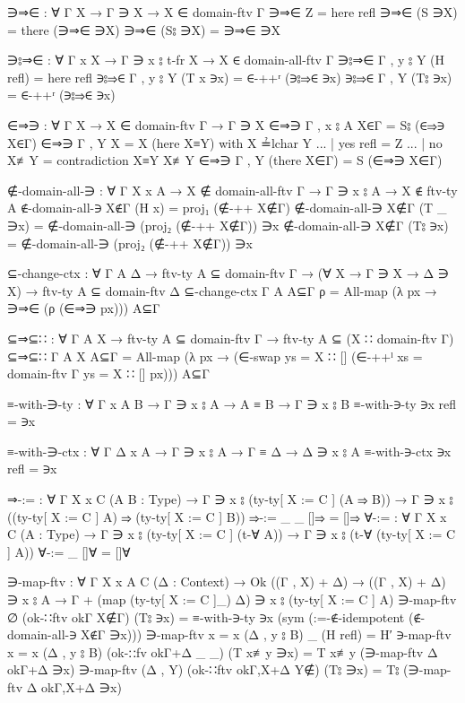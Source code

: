 \documentclass[logo,bsc,singlespacing,parskip,online]{infthesis}
\renewenvironment{code}{\mintedcopy[breaklines,breaksymbolleft=\;]{agda}}{\endmintedcopy}
\begin{document}
\begin{code}
  ∋⇒∈ : ∀ {Γ X} → Γ ∋ X → X ∈ domain-ftv Γ
  ∋⇒∈ Z = here refl
  ∋⇒∈ (S ∋X) = there (∋⇒∈ ∋X)
  ∋⇒∈ (S⦂ ∋X) = ∋⇒∈ ∋X

  ∋⦂⇒∈ : ∀ {Γ x X} → Γ ∋ x ⦂ t-fr X → X ∈ domain-all-ftv Γ
  ∋⦂⇒∈ {Γ , y ⦂ Y} (H refl) = here refl
  ∋⦂⇒∈ {Γ , y ⦂ Y} (T x ∋x) = ∈-++ʳ (∋⦂⇒∈ ∋x)
  ∋⦂⇒∈ {Γ , Y} (T⦂ ∋x) = ∈-++ʳ (∋⦂⇒∈ ∋x)

  ∈⇒∋ : ∀ {Γ X} → X ∈ domain-ftv Γ → Γ ∋ X
  ∈⇒∋ {Γ , x ⦂ A} X∈Γ = S⦂ (∈⇒∋ X∈Γ)
  ∈⇒∋ {Γ , Y} {X = X} (here X≡Y) with X ≟lchar Y
  ... | yes refl = Z
  ... | no  X≢Y  = contradiction X≡Y X≢Y
  ∈⇒∋ {Γ , Y} (there X∈Γ) = S (∈⇒∋ X∈Γ)

  ∉-domain-all-∋ : ∀ {Γ X x A} → X ∉ domain-all-ftv Γ → Γ ∋ x ⦂ A → X ∉ ftv-ty A
  ∉-domain-all-∋ X∉Γ (H x) = proj₁ (∉-++ X∉Γ)
  ∉-domain-all-∋ X∉Γ (T _ ∋x) = ∉-domain-all-∋ (proj₂ (∉-++ X∉Γ)) ∋x
  ∉-domain-all-∋ X∉Γ (T⦂ ∋x) = ∉-domain-all-∋ (proj₂ (∉-++ X∉Γ)) ∋x

  ⊆-change-ctx : ∀ {Γ A Δ}
    → ftv-ty A ⊆ domain-ftv Γ
    → (∀ {X} → Γ ∋ X → Δ ∋ X)
    → ftv-ty A ⊆ domain-ftv Δ
  ⊆-change-ctx {Γ} {A} A⊆Γ ρ = All-map (λ px → ∋⇒∈ (ρ (∈⇒∋ px))) A⊆Γ

  ⊆⇒⊆∷ : ∀ {Γ A X}
    → ftv-ty A ⊆ domain-ftv Γ
    → ftv-ty A ⊆ (X ∷ domain-ftv Γ)
  ⊆⇒⊆∷ {Γ} {A} {X} A⊆Γ = All-map (λ px → (∈-swap {ys = X ∷ []} (∈-++ˡ {xs = domain-ftv Γ} {ys = X ∷ []} px))) A⊆Γ

  ≡-with-∋-ty : ∀ {Γ x A B} → Γ ∋ x ⦂ A → A ≡ B → Γ ∋ x ⦂ B
  ≡-with-∋-ty ∋x refl = ∋x

  ≡-with-∋-ctx : ∀ {Γ Δ x A} → Γ ∋ x ⦂ A → Γ ≡ Δ → Δ ∋ x ⦂ A
  ≡-with-∋-ctx ∋x refl = ∋x

  ⇒-:= : ∀ {Γ X x C} (A B : Type) → Γ ∋ x ⦂ (ty-ty[ X := C ] (A ⇒ B)) → Γ ∋ x ⦂ ((ty-ty[ X := C ] A) ⇒ (ty-ty[ X := C ] B))
  ⇒-:= _ _ []⇒ = []⇒
  ∀-:= : ∀ {Γ X x C} (A : Type) → Γ ∋ x ⦂ (ty-ty[ X := C ] (t-∀ A)) → Γ ∋ x ⦂ (t-∀ (ty-ty[ X := C ] A))
  ∀-:= _ []∀ = []∀

  ∋-map-ftv : ∀ {Γ X x A C}
    (Δ : Context)
    → Ok ((Γ , X) + Δ)
    → ((Γ , X) + Δ) ∋ x ⦂ A
    → Γ + (map (ty-ty[ X := C ]_) Δ) ∋ x ⦂ (ty-ty[ X := C ] A)
  ∋-map-ftv ∅ (ok-∷ftv okΓ X∉Γ) (T⦂ ∋x) =
    ≡-with-∋-ty ∋x (sym (:=-∉-idempotent (∉-domain-all-∋ X∉Γ ∋x)))
  ∋-map-ftv {x = x} (Δ , y ⦂ B) _ (H refl) = H′
  ∋-map-ftv {x = x} (Δ , y ⦂ B) (ok-∷fv okΓ+Δ _ _) (T x≢y ∋x) = T x≢y (∋-map-ftv Δ okΓ+Δ ∋x)
  ∋-map-ftv (Δ , Y) (ok-∷ftv okΓ,X+Δ Y∉) (T⦂ ∋x) = T⦂ (∋-map-ftv Δ okΓ,X+Δ ∋x)

\end{code}
\end{document}
